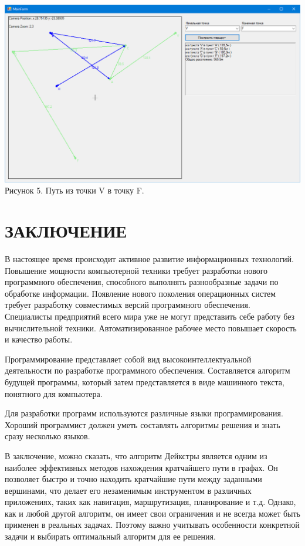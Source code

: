 \documentclass[a4paper,14pt, Times New Roman]{extarticle}
\begin{document}
\begin{center}
\includegraphics[width=1\textwidth]{vtof}
Рисунок 5. Путь из точки V в точку F.
\end{center}

\newpage
\section{ЗАКЛЮЧЕНИЕ}
В настоящее время происходит активное развитие информационных технологий. Повышение мощности компьютерной техники требует разработки нового программного обеспечения, способного выполнять разнообразные задачи по обработке информации. Появление нового поколения операционных систем требует разработку совместимых версий программного обеспечения. Специалисты предприятий всего мира уже не могут представить себе работу без вычислительной техники. Автоматизированное рабочее место повышает скорость и качество работы.

Программирование представляет собой вид высокоинтеллектуальной деятельности по разработке программного обеспечения. Составляется алгоритм будущей программы, который затем представляется в виде машинного текста, понятного для компьютера.

Для разработки программ используются различные языки программирования. Хороший программист должен уметь составлять алгоритмы решения и знать сразу несколько языков.

В заключение, можно сказать, что алгоритм Дейкстры является одним из наиболее эффективных методов нахождения кратчайшего пути в графах. Он позволяет быстро и точно находить кратчайшие пути между заданными вершинами, что делает его незаменимым инструментом в различных приложениях, таких как навигация, маршрутизация, планирование и т.д. Однако, как и любой другой алгоритм, он имеет свои ограничения и не всегда может быть применен в реальных задачах. Поэтому важно учитывать особенности конкретной задачи и выбирать оптимальный алгоритм для ее решения.
\end{document}
